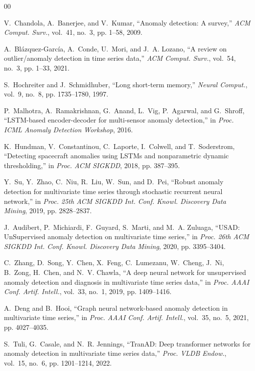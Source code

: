 \documentclass[conference,a4paper]{IEEEtran}
\begin{document}
\begin{thebibliography}{00}

V.~Chandola, A.~Banerjee, and V.~Kumar, ``Anomaly detection: A survey,''
\emph{ACM Comput. Surv.}, vol.~41, no.~3, pp. 1--58, 2009.

A.~Bl\'{a}zquez-Garc\'{i}a, A.~Conde, U.~Mori, and J.~A. Lozano, ``A review on
outlier/anomaly detection in time series data,'' \emph{ACM Comput. Surv.},
vol.~54, no.~3, pp. 1--33, 2021.

S.~Hochreiter and J.~Schmidhuber, ``Long short-term memory,'' \emph{Neural
Comput.}, vol.~9, no.~8, pp. 1735--1780, 1997.

P.~Malhotra, A.~Ramakrishnan, G.~Anand, L.~Vig, P.~Agarwal, and G.~Shroff,
``LSTM-based encoder-decoder for multi-sensor anomaly detection,'' in
\emph{Proc. ICML Anomaly Detection Workshop}, 2016.

K.~Hundman, V.~Constantinou, C.~Laporte, I.~Colwell, and T.~Soderstrom,
``Detecting spacecraft anomalies using LSTMs and nonparametric dynamic
thresholding,'' in \emph{Proc. ACM SIGKDD}, 2018, pp. 387--395.

Y.~Su, Y.~Zhao, C.~Niu, R.~Liu, W.~Sun, and D.~Pei, ``Robust anomaly detection
for multivariate time series through stochastic recurrent neural network,'' in
\emph{Proc. 25th ACM SIGKDD Int. Conf. Knowl. Discovery Data Mining}, 2019,
pp. 2828--2837.

J.~Audibert, P.~Michiardi, F.~Guyard, S.~Marti, and M.~A. Zuluaga, ``USAD:
UnSupervised anomaly detection on multivariate time series,'' in \emph{Proc.
26th ACM SIGKDD Int. Conf. Knowl. Discovery Data Mining}, 2020,
pp. 3395--3404.

C.~Zhang, D.~Song, Y.~Chen, X.~Feng, C.~Lumezanu, W.~Cheng, J.~Ni, B.~Zong,
H.~Chen, and N.~V. Chawla, ``A deep neural network for unsupervised anomaly
detection and diagnosis in multivariate time series data,'' in \emph{Proc.
AAAI Conf. Artif. Intell.}, vol.~33, no.~1, 2019, pp. 1409--1416.

A.~Deng and B.~Hooi, ``Graph neural network-based anomaly detection in
multivariate time series,'' in \emph{Proc. AAAI Conf. Artif. Intell.},
vol.~35, no.~5, 2021, pp. 4027--4035.

S.~Tuli, G.~Casale, and N.~R. Jennings, ``TranAD: Deep transformer networks
for anomaly detection in multivariate time series data,'' \emph{Proc. VLDB
Endow.}, vol.~15, no.~6, pp. 1201--1214, 2022.


\end{thebibliography}
\end{document}
